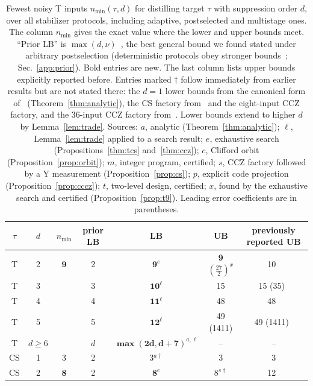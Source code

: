 \documentclass[aps,prl,reprint,twocolumn,amsmath,amssymb,floatfix,nofootinbib,superscriptaddress]{revtex4-2}
\newcommand{\TLB}{9}
\begin{document}
\begin{table}[t]
\caption{Fewest noisy T inputs $n_{\min}(\tau,d)$ for distilling target $\tau$ with suppression order $d$, over all stabilizer protocols, including adaptive, postselected and multistage ones. The column $n_{\min}$ gives the exact value where the lower and upper bounds meet. ``Prior LB'' is $\max(d,\nu)$~\cite{fangliu,fangliu2,regulaprl,beverland}, the best general bound we found stated under arbitrary postselection (deterministic protocols obey stronger bounds~\cite{regulatakagi}; Sec.~\ref{app:prior}). Bold entries are new. The last column lists upper bounds explicitly reported before. Entries marked $\dagger$ follow immediately from earlier results but are not stated there: the $d=1$ lower bounds from the canonical form of~\cite{beverland} (Theorem~\ref{thm:analytic}), the CS factory from~\cite[Proposition~A.4]{beverland} and the eight-input CCZ factory, and the 36-input CCZ factory from~\cite{wjs,howardcampbell}. Lower bounds extend to higher $d$ by Lemma~\ref{lem:trade}. Sources: $a$, analytic (Theorem~\ref{thm:analytic}); $\ell$, Lemma~\ref{lem:trade} applied to a search result; $e$, exhaustive search (Propositions~\ref{thm:tcs} and~\ref{thm:ccz}); $c$, Clifford orbit (Proposition~\ref{prop:orbit}); $m$, integer program, certified; $s$, CCZ factory followed by a Y measurement (Proposition~\ref{prop:cs}); $p$, explicit code projection (Proposition~\ref{prop:cccz}); $t$, two-level design, certified; $x$, found by the exhaustive search and certified (Proposition~\ref{prop:t9}). Leading error coefficients are in parentheses.}
\label{tab:final}
\begin{ruledtabular}
\begin{tabular}{ccccccc}
$\tau$ & $d$ & $n_{\min}$ & prior LB & LB & UB & previously reported UB \\
\hline
T & 2 & $\mathbf{9}$ & 2 & $\mathbf{\TLB}^e$ & $\mathbf{9}$ $(\tfrac{27}{2})^x$ & 10~\cite{mek} \\
T & 3 & & 3 & $\mathbf{10}^\ell$ & 15 & 15 (35)~\cite{bravyikitaev} \\
T & 4 & & 4 & $\mathbf{11}^\ell$ & 48 & 48~\cite{wjs} \\
T & 5 & & 5 & $\mathbf{12}^\ell$ & 49 (1411) & 49 (1411)~\cite{bravyihaah} \\
T & $d\geq6$ & & $d$ & $\mathbf{\max(2d,d{+}7)}^{a,\ell}$ & -- & -- \\
CS & 1 & 3 & 2 & 3$^{a\dagger}$ & 3 & 3 \\
CS & 2 & $\mathbf{8}$ & 2 & $\mathbf{8}^e$ & $8^{s\dagger}$ & 12~\cite{campbellhoward,gong} \\

\end{tabular}
\end{ruledtabular}
\end{table}
\end{document}
